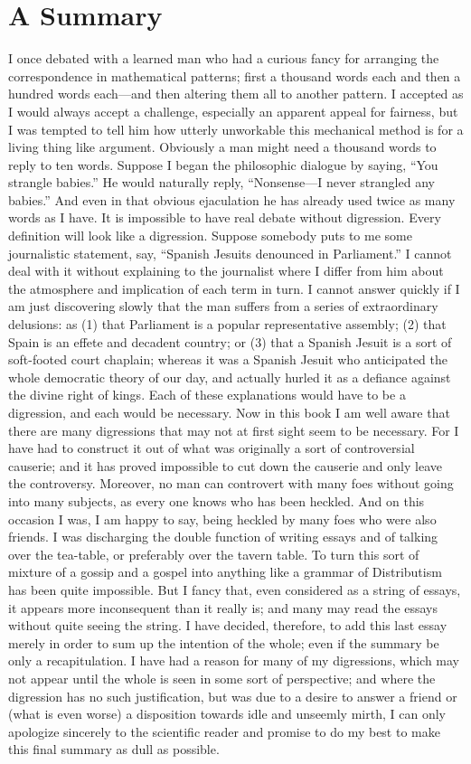 \documentclass{book}
\begin{document}
\setcounter{chapter}{0}\part{A Summary}
\label{chapter-22}
I once debated with a learned man who had a curious fancy for arranging the correspondence in mathematical patterns; first a thousand words each and then a hundred words each—and then altering them all to another pattern. I accepted as I would always accept a challenge, especially an apparent appeal for fairness, but I was tempted to tell him how utterly unworkable this mechanical method is for a living thing like argument. Obviously a man might need a thousand words to reply to ten words. Suppose I began the philosophic dialogue by saying, “You strangle babies.” He would naturally reply, “Nonsense—I never strangled any babies.” And even in that obvious ejaculation he has already used twice as many words as I have. It is impossible to have real debate without digression. Every definition will look like a digression. Suppose somebody puts to me some journalistic statement, say, “Spanish Jesuits denounced in Parliament.” I cannot deal with it without explaining to the journalist where I differ from him about the atmosphere and implication of each term in turn. I cannot answer quickly if I am just discovering slowly that the man suffers from a series of extraordinary delusions: as (1) that Parliament is a popular representative assembly; (2) that Spain is an effete and decadent country; or (3) that a Spanish Jesuit is a sort of soft-footed court chaplain; whereas it was a Spanish Jesuit who anticipated the whole democratic theory of our day, and actually hurled it as a defiance against the divine right of kings. Each of these explanations would have to be a digression, and each would be necessary. Now in this book I am well aware that there are many digressions that may not at first sight seem to be necessary. For I have had to construct it out of what was originally a sort of controversial causerie; and it has proved impossible to cut down the causerie and only leave the controversy. Moreover, no man can controvert with many foes without going into many subjects, as every one knows who has been heckled. And on this occasion I was, I am happy to say, being heckled by many foes who were also friends. I was discharging the double function of writing essays and of talking over the tea-table, or preferably over the tavern table. To turn this sort of mixture of a gossip and a gospel into anything like a grammar of Distributism has been quite impossible. But I fancy that, even considered as a string of essays, it appears more inconsequent than it really is; and many may read the essays without quite seeing the string. I have decided, therefore, to add this last essay merely in order to sum up the intention of the whole; even if the summary be only a recapitulation. I have had a reason for many of my digressions, which may not appear until the whole is seen in some sort of perspective; and where the digression has no such justification, but was due to a desire to answer a friend or (what is even worse) a disposition towards idle and unseemly mirth, I can only apologize sincerely to the scientific reader and promise to do my best to make this final summary as dull as possible.
\end{document}
